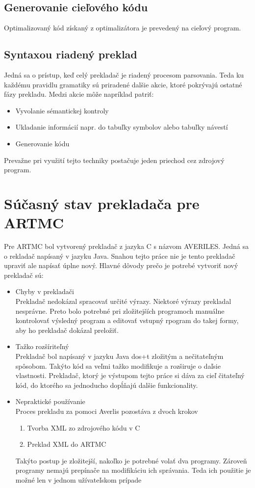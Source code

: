\section{Generovanie cieľového kódu}
Optimalizovaný kód získaný z optimalizátora je prevedený na cieľový program.

\section{Syntaxou riadený preklad}
\label{sec_synta}
Jedná sa o prístup, keď celý prekladač je riadený procesom parsovania. Teda ku každému pravidlu gramatiky sú priradené dalšie akcie, ktoré pokrývajú ostatné fázy prekladu. Medzi akcie môže napríklad patriť:
\begin{itemize}
    \item Vyvolanie sémantickej kontroly
    \item Ukladanie informácií napr. do tabuľky symbolov alebo tabuľky návestí
    \item Generovanie kódu
\end{itemize}
Prevažne pri využití tejto techniky postačuje jeden priechod cez zdrojový program.


\chapter{Súčasný stav prekladača pre ARTMC}
Pre ARTMC bol vytvorený prekladač z jazyka C s názvom AVERILES. Jedná sa o
rekladač napísaný v jazyku Java. Snahou tejto práce nie je tento prekladač
upraviť ale napísať úplne nový. Hlavné dôvody prečo je potrebé vytvoriť nový
prekladač sú:
\begin{itemize}
    \item Chyby v prekladači\\
        Prekladač nedokázal spracovať určité výrazy. Niektoré výrazy prekladal nesprávne.
        Preto bolo potrebné pri zložitejších programoch manuálne kontrolovať výsledný
        program a editovať vstupný rpogram do takej formy, aby ho prekladač dokázal
        preložiť.
    \item Tažko rozšíriteľný\\
        Prekladač bol napísaný v jazyku Java dos+t zložitým a nečitateľným spôsobom. Takýto
        kód sa veľmi tažko modifikuje a rozširuje o daľsie vlastnosti. Prekladač,
        ktorý je výstupom tejto práce si dáva za cieľ čitateľný kód, do ktorého
        sa jednoducho dopĺňajú dalšie funkcionality.
    \item Nepraktické používanie\\
        Proces prekladu za pomoci Averlis pozostáva z dvoch krokov
        \begin{enumerate}
            \item Tvorba XML zo zdrojového kódu v C
            \item Preklad XML do ARTMC
        \end{enumerate}
        Takýto postup je zložitejší, nakoľko je potrebné volať dva programy.
        Zároveň programy nemajú prepínače na modifikáciu ich správania. Teda
        ich použitie je možné len v jednom užívateľskom prípade
\end{itemize}

